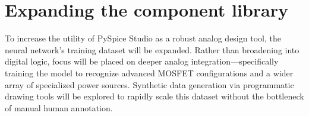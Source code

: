 \section{Expanding the component library}
To increase the utility of PySpice Studio as a robust analog design tool, the neural network's training dataset will be expanded. Rather than broadening into digital logic, focus will be placed on deeper analog integration—specifically training the model to recognize advanced MOSFET configurations and a wider array of specialized power sources. Synthetic data generation via programmatic drawing tools will be explored to rapidly scale this dataset without the bottleneck of manual human annotation.
